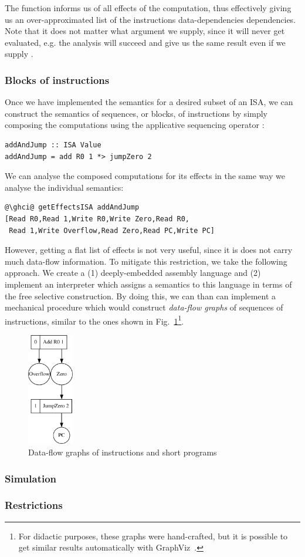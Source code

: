 The  function informs us of all effects of the computation, thus
effectively giving us an over-approximated list of the instructions
data-dependencies dependencies. Note that it does not matter
what argument we supply, since it will never get evaluated, e.g. the analysis will succeed and give us the same result even if we supply .

\subsubsection{\textbf{Blocks of instructions}}

Once we have implemented the semantics for a desired subset of an ISA, we can construct the
semantics of sequences, or blocks, of instructions by simply composing the  computations
using the applicative sequencing operator \hs{*>}:

\begin{verbatim}
addAndJump :: ISA Value
addAndJump = add R0 1 *> jumpZero 2
\end{verbatim}

We can analyse the composed computations for its effects in the same way we analyse the
individual semantics:

\begin{verbatim}
@\ghci@ getEffectsISA addAndJump
[Read R0,Read 1,Write R0,Write Zero,Read R0,
 Read 1,Write Overflow,Read Zero,Read PC,Write PC]
\end{verbatim}

However, getting a flat list of effects is not very useful, since it is does not
carry much data-flow information. To mitigate this restriction, we take the following
approach. We create a (1) deeply-embedded assembly language and (2) implement an
interpreter which assigns a semantics to this language in terms of the free selective
construction. By doing this, we can than can implement a mechanical procedure which
would construct \emph{data-flow graphs} of sequences of instructions, similar to
the ones shown in Fig.~\ref{fig-addAndJump-gcd}\footnote{For didactic purposes,
these graphs were hand-crafted, but it is possible to get similar results automatically
with GraphViz~\cite{graphviz}.}.

\begin{figure}
\includegraphics[width=2cm]{./img/ISA/addAndJump.pdf}
\caption{Data-flow graphs of instructions and short programs}
\label{fig-addAndJump-gcd}
\end{figure}

\subsubsection{\textbf{Simulation}}



\subsubsection{\textbf{Restrictions}}

